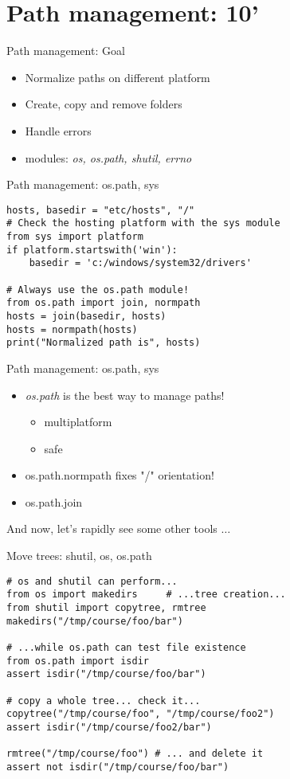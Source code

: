 \section{Path management: 10'}

\begin{frame}[fragile]{Path management: Goal}
\begin{itemize}
\item Normalize paths on different platform
\item Create, copy and remove folders
\item Handle errors
\item modules: \emph{os, os.path, shutil, errno}
\end{itemize}
\end{frame}

\begin{frame}[fragile]{Path management: os.path, sys}
\begin{verbatim}
hosts, basedir = "etc/hosts", "/"
# Check the hosting platform with the sys module
from sys import platform
if platform.startswith('win'):
    basedir = 'c:/windows/system32/drivers'

# Always use the os.path module!
from os.path import join, normpath 
hosts = join(basedir, hosts)
hosts = normpath(hosts)
print("Normalized path is", hosts)
\end{verbatim}
\end{frame}

\begin{frame}[fragile]{Path management: os.path, sys}
\Large
\begin{itemize}
\item \emph{os.path} is the best way to manage paths!
\begin{itemize}
 \Large
 \item multiplatform
 \item safe
 \end{itemize}
 
\item os.path.normpath fixes "/" orientation!
\item os.path.join 
 \end{itemize}
And now, let's rapidly see some other tools $\ldots$
\end{frame}

\begin{frame}[fragile]{Move trees: shutil, os, os.path}
\begin{verbatim}
# os and shutil can perform...
from os import makedirs     # ...tree creation...
from shutil import copytree, rmtree 
makedirs("/tmp/course/foo/bar")

# ...while os.path can test file existence
from os.path import isdir            
assert isdir("/tmp/course/foo/bar")

# copy a whole tree... check it...
copytree("/tmp/course/foo", "/tmp/course/foo2") 
assert isdir("/tmp/course/foo2/bar")            

rmtree("/tmp/course/foo") # ... and delete it
assert not isdir("/tmp/course/foo/bar")
\end{verbatim}
\end{frame}

